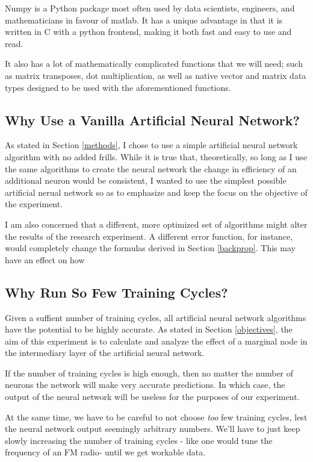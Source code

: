 \documentclass[12pt]{article}
\begin{document}
Numpy is a Python package most often used by data scientists, engineers, and mathematicians in favour of matlab. It has a unique advantage in that it is written in C with a python frontend, making it both fast and easy to use and read.

It also has a lot of mathematically complicated functions that we will need; such as matrix transposes, dot multiplication, as well as native vector and matrix data types designed to be used with the aforementioned functions.

\subsection{Why Use a Vanilla Artificial Neural Network?}

As stated in Section \ref{methods}, I chose to use a simple artificial neural network algorithm with no added frills. While it is true that, theoretically, so long as I use the same algorithms to create the neural network the change in efficiency of an additional neuron would be consistent, I wanted to use the simplest possible artificial nerual network so as to emphasize and keep the focus on the objective of the experiment.

I am also concerned that a different, more optimized set of algorithms might alter the results of the research experiment. A different error function, for instance, would completely change the formulas derived in Section \ref{backprop}. This may have an effect on how

\subsection{Why Run So Few Training Cycles?}

Given a suffient number of training cycles, all artificial neural network algorithms have the potential to be highly accurate. As stated in Section \ref{objectives}, the aim of this experiment is to calculate and analyze the effect of a marginal node in the intermediary layer of the artificial neural network.

If the number of training cycles is high enough, then no matter the number of neurons the network will make very accurate predictions. In which case, the output of the neural network will be useless for the purposes of our experiment.

At the same time, we have to be careful to not choose \textit{too} few training cycles, lest the neural network output seemingly arbitrary numbers. We'll have to just keep slowly increasing the number of training cycles - like one would tune the frequency of an FM radio- until we get workable data.
\end{document}
